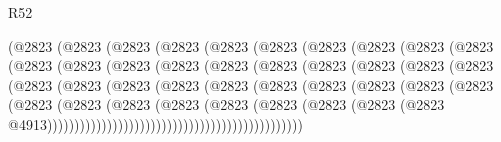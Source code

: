 \begin{lexlean}{R52}
\begin{coremodule}
                    (@2823
                      (@2823
                        (@2823
                          (@2823
                            (@2823
                              (@2823
                                (@2823
                                  (@2823
                                    (@2823
                                      (@2823
                                        (@2823
                                          (@2823
                                            (@2823
                                              (@2823
                                                (@2823
                                                  (@2823
                                                    (@2823
                                                      (@2823
                                                        (@2823
                                                          (@2823
                                                            (@2823
                                                              (@2823
                                                                (@2823
                                                                  (@2823
                                                                    (@2823
                                                                      (@2823
                                                                        (@2823
                                                                          (@2823
                                                                            (@2823
                                                                              (@2823
                                                                                (@2823
                                                                                  (@2823
                                                                                    (@2823
                                                                                      (@2823
                                                                                        (@2823
                                                                                          (@2823
                                                                                            (@2823
                                                                                              (@2823
                                                                                                (@2823
                                                                                                  @4913)))))))))))))))))))))))))))))))))))))))))))))))

\end{coremodule}
\end{lexlean}
